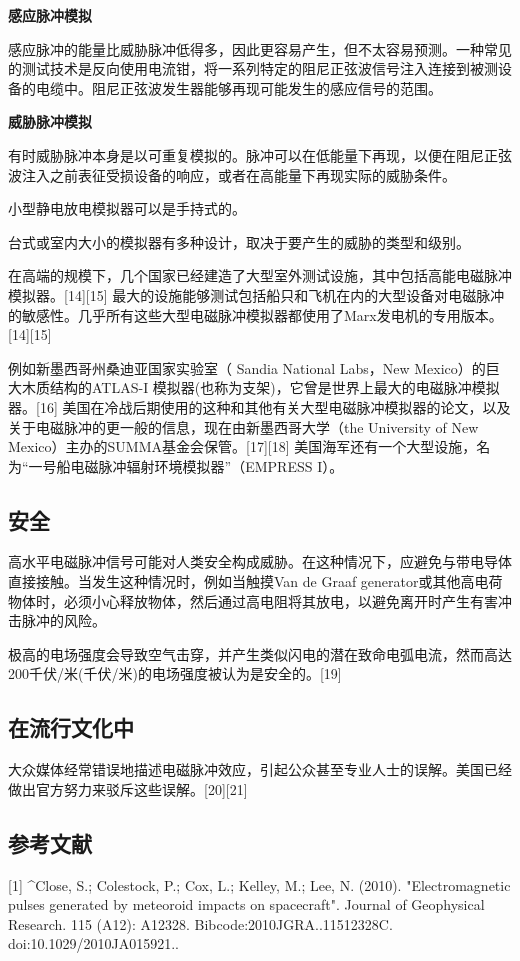 \textbf{感应脉冲模拟}

感应脉冲的能量比威胁脉冲低得多，因此更容易产生，但不太容易预测。一种常见的测试技术是反向使用电流钳，将一系列特定的阻尼正弦波信号注入连接到被测设备的电缆中。阻尼正弦波发生器能够再现可能发生的感应信号的范围。

\textbf{威胁脉冲模拟}

有时威胁脉冲本身是以可重复模拟的。脉冲可以在低能量下再现，以便在阻尼正弦波注入之前表征受损设备的响应，或者在高能量下再现实际的威胁条件。

小型静电放电模拟器可以是手持式的。

台式或室内大小的模拟器有多种设计，取决于要产生的威胁的类型和级别。

在高端的规模下，几个国家已经建造了大型室外测试设施，其中包括高能电磁脉冲模拟器。[14][15] 最大的设施能够测试包括船只和飞机在内的大型设备对电磁脉冲的敏感性。几乎所有这些大型电磁脉冲模拟器都使用了Marx发电机的专用版本。[14][15]

例如新墨西哥州桑迪亚国家实验室（ Sandia National Labs，New Mexico）的巨大木质结构的ATLAS-I 模拟器(也称为支架)，它曾是世界上最大的电磁脉冲模拟器。[16] 美国在冷战后期使用的这种和其他有关大型电磁脉冲模拟器的论文，以及关于电磁脉冲的更一般的信息，现在由新墨西哥大学（the University of New Mexico）主办的SUMMA基金会保管。[17][18] 美国海军还有一个大型设施，名为“一号船电磁脉冲辐射环境模拟器”（EMPRESS I）。

\subsection{安全}
高水平电磁脉冲信号可能对人类安全构成威胁。在这种情况下，应避免与带电导体直接接触。当发生这种情况时，例如当触摸Van de Graaf generator或其他高电荷物体时，必须小心释放物体，然后通过高电阻将其放电，以避免离开时产生有害冲击脉冲的风险。

极高的电场强度会导致空气击穿，并产生类似闪电的潜在致命电弧电流，然而高达200千伏/米(千伏/米)的电场强度被认为是安全的。[19]

\subsection{在流行文化中}
大众媒体经常错误地描述电磁脉冲效应，引起公众甚至专业人士的误解。美国已经做出官方努力来驳斥这些误解。[20][21]

\subsection{参考文献}
[1]
^Close, S.; Colestock, P.; Cox, L.; Kelley, M.; Lee, N. (2010). "Electromagnetic pulses generated by meteoroid impacts on spacecraft". Journal of Geophysical Research. 115 (A12): A12328. Bibcode:2010JGRA..11512328C. doi:10.1029/2010JA015921..

